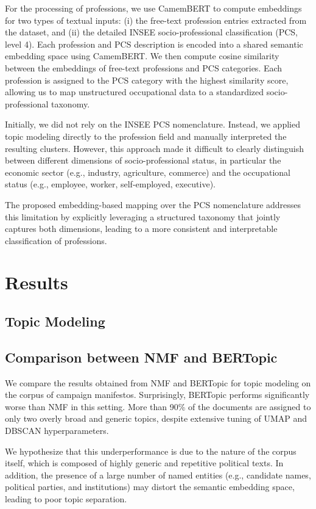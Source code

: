 \documentclass{article}
\begin{document}
For the processing of professions, we use CamemBERT to compute embeddings for two types of textual inputs: (i) the free-text profession entries extracted from the dataset, and (ii) the detailed INSEE socio-professional classification (PCS, level 4). Each profession and PCS description is encoded into a shared semantic embedding space using CamemBERT. We then compute cosine similarity between the embeddings of free-text professions and PCS categories. Each profession is assigned to the PCS category with the highest similarity score, allowing us to map unstructured occupational data to a standardized socio-professional taxonomy.

Initially, we did not rely on the INSEE PCS nomenclature. Instead, we applied topic modeling directly to the profession field and manually interpreted the resulting clusters. However, this approach made it difficult to clearly distinguish between different dimensions of socio-professional status, in particular the economic sector (e.g., industry, agriculture, commerce) and the occupational status (e.g., employee, worker, self-employed, executive). 

The proposed embedding-based mapping over the PCS nomenclature addresses this limitation by explicitly leveraging a structured taxonomy that jointly captures both dimensions, leading to a more consistent and interpretable classification of professions.

\section{Results}

\subsection{Topic Modeling}

\subsection{Comparison between NMF and BERTopic}

We compare the results obtained from NMF and BERTopic for topic modeling on the corpus of campaign manifestos. Surprisingly, BERTopic performs significantly worse than NMF in this setting. More than 90\% of the documents are assigned to only two overly broad and generic topics, despite extensive tuning of UMAP and DBSCAN hyperparameters.

We hypothesize that this underperformance is due to the nature of the corpus itself, which is composed of highly generic and repetitive political texts. In addition, the presence of a large number of named entities (e.g., candidate names, political parties, and institutions) may distort the semantic embedding space, leading to poor topic separation.
\end{document}
